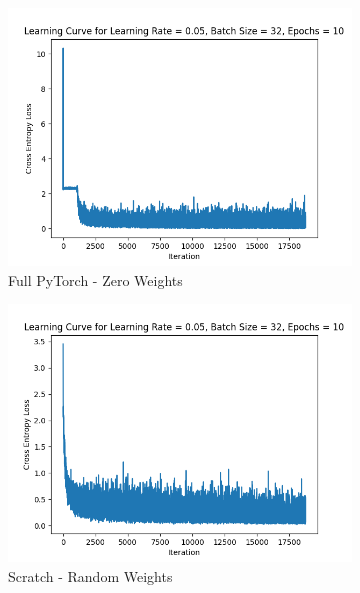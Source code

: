 \documentclass[a4paper]{article}
\theoremstyle{definition}
\newenvironment{soln}{
    \leavevmode\color{blue}\ignorespaces
}{}
\begin{document}
\begin{enumerate}
\begin{soln}
\begin{figure}[H]
\begin{subfigure}{0.5\textwidth}
              \includegraphics[width=1.1\linewidth]{MNIST_Learning_Curve_Torch_Zero.png}
              \caption{Full PyTorch - Zero Weights}
              \label{fig:3sub2}
            \end{subfigure}
            \begin{subfigure}{0.5\textwidth}
              \centering
              \includegraphics[width=1.1\linewidth]{MNIST_Learning_Curve_Self_Random.png}
              \caption{Scratch - Random Weights}
              \label{fig:3sub3}
            \end{subfigure}%
            \begin{subfigure}{0.5\textwidth}
              \centering

\end{subfigure}
\end{figure}
\end{soln}
\end{enumerate}
\end{document}
